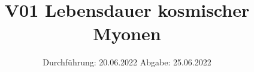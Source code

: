

\subject{Fortgeschrittenenpraktikum}
\title{V01 Lebensdauer kosmischer Myonen}
\date{%
  Durchführung: 20.06.2022
  \hspace{3em}
  Abgabe: 25.06.2022
}



\maketitle
\thispagestyle{empty}
\tableofcontents
\newpage






%

\printbibliography{}




